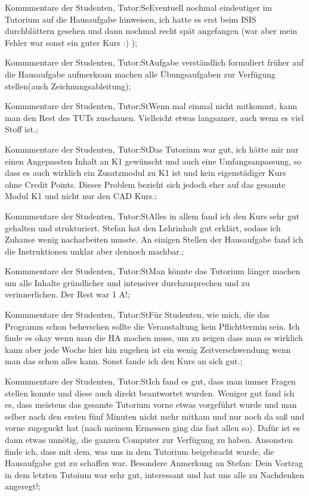 \documentclass[10pt]{beamer}
\begin{document}
\begin{frame}[fragile]{Kommmentare der Studenten, Tutor:Se}Eventuell nochmal eindeutiger im Tutorium auf die Hausaufgabe hinweisen, ich hatte es erst beim ISIS durchblättern gesehen und dann nochmal recht spät angefangen (war aber mein Fehler   war sonst ein guter Kurs :) );
 \end{frame}
\begin{frame}[fragile]{Kommmentare der Studenten, Tutor:St}Aufgabe verständlich formuliert
 früher auf die Hausaufgabe aufmerksam machen
 alle Übungsaufgaben zur Verfügung stellen(auch Zeichnungsableitung);
 \end{frame}
\begin{frame}[fragile]{Kommmentare der Studenten, Tutor:St}Wenn mal einmal nicht mitkommt, kann man den Rest des TUTs zuschauen. Vielleicht etwas langsamer, auch wenn es viel Stoff ist.;
 \end{frame}
\begin{frame}[fragile]{Kommmentare der Studenten, Tutor:St}Das Tutorium war gut, ich hätte mir nur einen Angepassten Inhalt an K1 gewünscht und auch eine Umfangsanpassung, so dass es auch wirklich ein Zusatzmodul zu K1 ist und kein eigenstädiger Kurs ohne Credit Points. Dieses Problem bezieht sich jedoch eher auf das gesamte Modul K1 und nicht nur den CAD Kurs.;
 \end{frame}
\begin{frame}[fragile]{Kommmentare der Studenten, Tutor:St}Alles in allem fand ich den Kurs sehr gut gehalten und strukturiert. Stefan hat den Lehrinhalt gut erklärt, sodass ich Zuhause wenig nacharbeiten musste. 
 An einigen Stellen der Hausaufgabe fand ich die Instruktionen unklar aber dennoch machbar.;
 \end{frame}
\begin{frame}[fragile]{Kommmentare der Studenten, Tutor:St}Man könnte das Tutorium länger machen um alle Inhalte gründlicher und intensiver durchzusprechen und zu verinnerlichen. Der Rest war 1 A!;
 \end{frame}
\begin{frame}[fragile]{Kommmentare der Studenten, Tutor:St}Für Studenten, wie mich, die das Programm schon beherschen sollte die Veranstaltung kein Pflichttermin sein. Ich finde es okay wenn man die HA machen muss, um zu zeigen dass man es wirklich kann aber jede Woche hier hin zugehen ist ein wenig Zeitverschwendung wenn man das schon alles kann. Sonst fande ich den Kurs an sich gut.;
 \end{frame}
\begin{frame}[fragile]{Kommmentare der Studenten, Tutor:St}Ich fand es gut, dass man immer Fragen stellen konnte und diese auch direkt beantwortet wurden.  Weniger gut fand ich es, dass meistens das gesamte Tutorium vorne etwas vorgeführt wurde und man selber nach den ersten fünf Minuten nicht mehr mitkam und nur noch da saß und vorne zugeguckt hat (nach meinem Ermessen ging das fast allen so). Dafür ist es dann etwas unnötig, die ganzen Computer zur Verfügung zu haben. Ansonsten finde ich, dass mit dem, was uns in dem Tutorium beigebracht wurde, die Hausaufgabe gut zu schaffen war. Besondere Anmerkung an Stefan: Dein Vortrag in dem letzten Tutoium war sehr gut, interessant und hat uns alle zu Nachdenken angeregt!;
 \end{frame}
\end{document}
